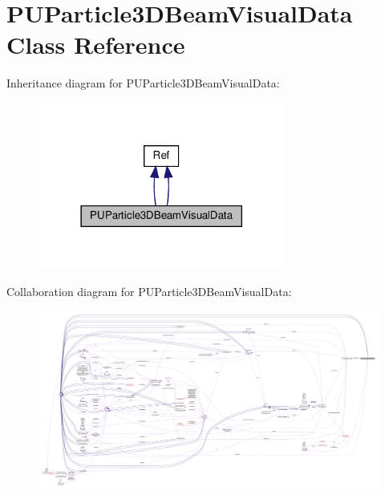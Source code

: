 \hypertarget{classPUParticle3DBeamVisualData}{}\section{P\+U\+Particle3\+D\+Beam\+Visual\+Data Class Reference}
\label{classPUParticle3DBeamVisualData}


Inheritance diagram for P\+U\+Particle3\+D\+Beam\+Visual\+Data\+:
\nopagebreak
\begin{figure}[H]
\begin{center}
\leavevmode
\includegraphics[width=230pt]{classPUParticle3DBeamVisualData__inherit__graph}
\end{center}
\end{figure}


Collaboration diagram for P\+U\+Particle3\+D\+Beam\+Visual\+Data\+:
\nopagebreak
\begin{figure}[H]
\begin{center}
\leavevmode
\includegraphics[width=350pt]{classPUParticle3DBeamVisualData__coll__graph}
\end{center}
\end{figure}
